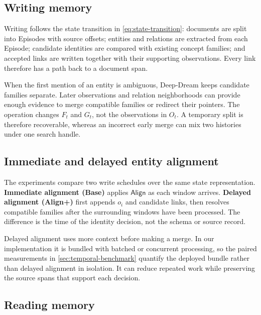\subsection{Writing memory}

Writing follows the state transition in \cref{eq:state-transition}: documents are split into Episodes with source offsets; entities and relations are extracted from each Episode; candidate identities are compared with existing concept families; and accepted links are written together with their supporting observations. Every link therefore has a path back to a document span.

When the first mention of an entity is ambiguous, Deep-Dream keeps candidate families separate. Later observations and relation neighborhoods can provide enough evidence to merge compatible families or redirect their pointers. The operation changes $F_t$ and $G_t$, not the observations in $O_t$. A temporary split is therefore recoverable, whereas an incorrect early merge can mix two histories under one search handle.

\subsection{Immediate and delayed entity alignment}

The experiments compare two write schedules over the same state representation. \textbf{Immediate alignment (Base)} applies $\mathsf{Align}$ as each window arrives. \textbf{Delayed alignment (Align+)} first appends $o_i$ and candidate links, then resolves compatible families after the surrounding windows have been processed. The difference is the time of the identity decision, not the schema or source record.

Delayed alignment uses more context before making a merge. In our implementation it is bundled with batched or concurrent processing, so the paired measurements in \cref{sec:temporal-benchmark} quantify the deployed bundle rather than delayed alignment in isolation. It can reduce repeated work while preserving the source spans that support each decision.

\subsection{Reading memory}
\label{sec:answer-paths}

